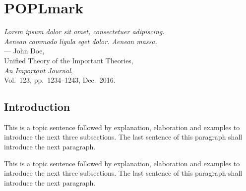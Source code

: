 

%
%
\chapter{POPLmark}
\label{ch:appendixOne}

\begin{flushright}
{\slshape Lorem ipsum dolor sit amet, consectetuer adipiscing.}\\
{\slshape Aenean commodo ligula eget dolor. Aenean massa.}\\
\medskip
--- John Doe,\\
Unified Theory of the Important Theories,\\
{\slshape An Important Journal},\\
Vol.~123, pp.~1234--1243, Dec.~2016.\\
\end{flushright}

\bigskip

\section{Introduction}
\label{sec:appen_1_introduction}

This is a topic sentence followed by explanation, elaboration and examples to introduce the next three subsections. The last sentence of this paragraph shall introduce the next paragraph. \lipsum[1]

This is a topic sentence followed by explanation, elaboration and examples to introduce the next three subsections. The last sentence of this paragraph shall introduce the next paragraph. \lipsum[1]

